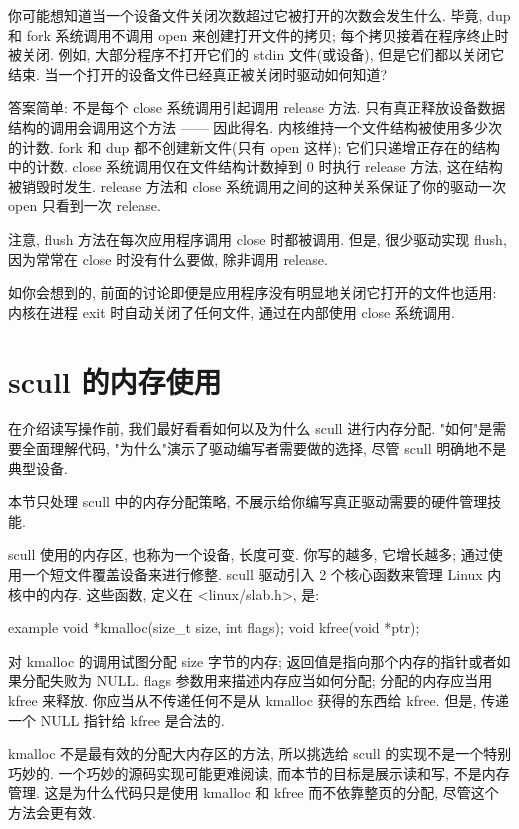\documentclass[lang=cn,newtx,10pt,scheme=chinese]{elegantbook}
\begin{document}
你可能想知道当一个设备文件关闭次数超过它被打开的次数会发生什么. 毕竟, dup 和 fork 系统调用不调用 open 来创建打开文件的拷贝; 每个拷贝接着在程序终止时被关闭. 例如, 大部分程序不打开它们的 stdin 文件(或设备), 但是它们都以关闭它结束. 当一个打开的设备文件已经真正被关闭时驱动如何知道?

答案简单: 不是每个 close 系统调用引起调用 release 方法. 只有真正释放设备数据结构的调用会调用这个方法 —— 因此得名. 内核维持一个文件结构被使用多少次的计数. fork 和 dup 都不创建新文件(只有 open 这样); 它们只递增正存在的结构中的计数. close 系统调用仅在文件结构计数掉到 0 时执行 release 方法, 这在结构被销毁时发生. release 方法和 close 系统调用之间的这种关系保证了你的驱动一次 open 只看到一次 release.

注意, flush 方法在每次应用程序调用 close 时都被调用. 但是, 很少驱动实现 flush, 因为常常在 close 时没有什么要做, 除非调用 release.

如你会想到的, 前面的讨论即便是应用程序没有明显地关闭它打开的文件也适用: 内核在进程 exit 时自动关闭了任何文件, 通过在内部使用 close 系统调用.

\section{scull 的内存使用}

在介绍读写操作前, 我们最好看看如何以及为什么 scull 进行内存分配. "如何"是需要全面理解代码, "为什么"演示了驱动编写者需要做的选择, 尽管 scull 明确地不是典型设备.

本节只处理 scull 中的内存分配策略, 不展示给你编写真正驱动需要的硬件管理技能.

scull 使用的内存区, 也称为一个设备, 长度可变. 你写的越多, 它增长越多; 通过使用一个短文件覆盖设备来进行修整. scull 驱动引入 2 个核心函数来管理 Linux 内核中的内存. 这些函数, 定义在 <linux/slab.h>, 是:

\begin{mycode}{example}
    void *kmalloc(size_t size, int flags);
    void kfree(void *ptr);
\end{mycode}

对 kmalloc 的调用试图分配 size 字节的内存; 返回值是指向那个内存的指针或者如果分配失败为 NULL. flags 参数用来描述内存应当如何分配; 分配的内存应当用 kfree 来释放. 你应当从不传递任何不是从 kmalloc 获得的东西给 kfree. 但是, 传递一个 NULL 指针给 kfree 是合法的.

kmalloc 不是最有效的分配大内存区的方法, 所以挑选给 scull 的实现不是一个特别巧妙的. 一个巧妙的源码实现可能更难阅读, 而本节的目标是展示读和写, 不是内存管理. 这是为什么代码只是使用 kmalloc 和 kfree 而不依靠整页的分配, 尽管这个方法会更有效.
\end{document}
